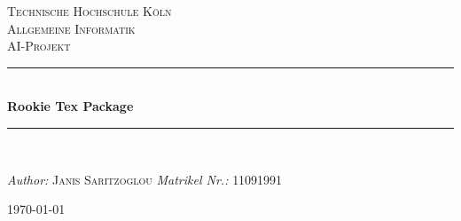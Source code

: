 \begin{titlepage}
\newcommand{\HRule}{\rule{\linewidth}{0.5mm}}
\center
\textsc{\LARGE Technische Hochschule Köln} \\[1.5cm] 
\textsc{\Large Allgemeine Informatik} \\[0.5cm]
\textsc{\large AI-Projekt} \\
\HRule  \\[0.4cm]
{ \huge \bfseries Rookie Tex Package} \\[0.4cm]
\HRule  \\[1.5cm]
\begin{minipage}{0.4\textwidth}
\begin{flushleft} \large
\emph{Author:} \newline
\textsc{Janis Saritzoglou}
\emph{Matrikel Nr.:}
\textsc{11091991}
\end{flushleft}
\end{minipage}
\hfill
\vfill
{\large \today}
\end{titlepage}
